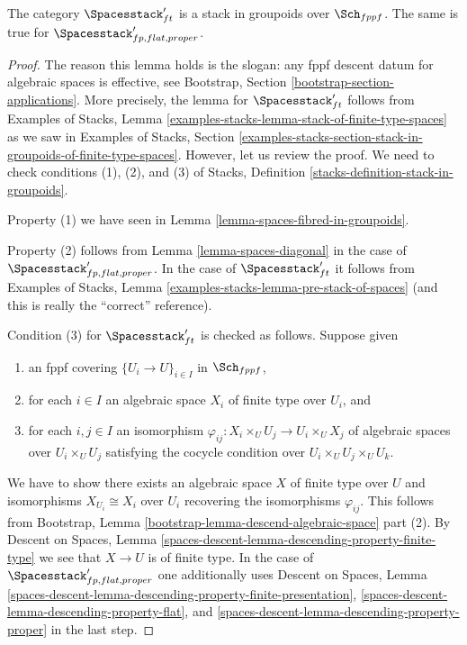 \begin{lemma}
\label{lemma-spaces-stack}
The category $\Spacesstack'_{ft}$ is a stack in groupoids
over $\Sch_{fppf}$. The same is true for
$\Spacesstack'_{fp, flat, proper}$.
\end{lemma}

\begin{proof}
The reason this lemma holds is the slogan: any fppf descent datum for algebraic
spaces is effective, see Bootstrap, Section
\ref{bootstrap-section-applications}.
More precisely, the lemma for $\Spacesstack'_{ft}$ follows from
Examples of Stacks, Lemma
\ref{examples-stacks-lemma-stack-of-finite-type-spaces}
as we saw in Examples of Stacks, Section
\ref{examples-stacks-section-stack-in-groupoids-of-finite-type-spaces}.
However, let us review the proof. We need to check conditions
(1), (2), and (3) of Stacks, Definition
\ref{stacks-definition-stack-in-groupoids}.

\medskip\noindent
Property (1) we have seen in Lemma \ref{lemma-spaces-fibred-in-groupoids}.

\medskip\noindent
Property (2) follows from
Lemma \ref{lemma-spaces-diagonal} in the case of
$\Spacesstack'_{fp, flat, proper}$.
In the case of $\Spacesstack'_{ft}$ it follows
from Examples of Stacks, Lemma
\ref{examples-stacks-lemma-pre-stack-of-spaces}
(and this is really the ``correct'' reference).

\medskip\noindent
Condition (3) for $\Spacesstack'_{ft}$ is checked as follows. Suppose given
\begin{enumerate}
\item an fppf covering $\{U_i \to U\}_{i \in I}$ in $\Sch_{fppf}$,
\item for each $i \in I$ an algebraic space $X_i$ of finite type over
$U_i$, and
\item for each $i, j \in I$ an isomorphism
$\varphi_{ij} : X_i \times_U U_j \to U_i \times_U X_j$ of algebraic spaces
over $U_i \times_U U_j$ satisfying the cocycle condition over
$U_i \times_U U_j \times_U U_k$.
\end{enumerate}
We have to show there exists an algebraic space $X$ of finite type over $U$
and isomorphisms $X_{U_i} \cong X_i$ over $U_i$ recovering the
isomorphisms $\varphi_{ij}$. This follows from
Bootstrap, Lemma \ref{bootstrap-lemma-descend-algebraic-space} part (2).
By Descent on Spaces, Lemma
\ref{spaces-descent-lemma-descending-property-finite-type}
we see that $X \to U$ is of finite type.
In the case of $\Spacesstack'_{fp, flat, proper}$
one additionally uses
Descent on Spaces, Lemma
\ref{spaces-descent-lemma-descending-property-finite-presentation},
\ref{spaces-descent-lemma-descending-property-flat}, and
\ref{spaces-descent-lemma-descending-property-proper}
in the last step.
\end{proof}

